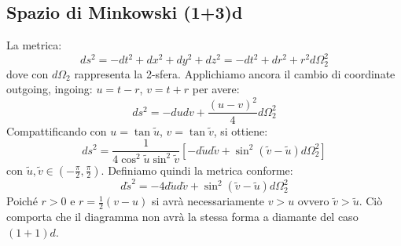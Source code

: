\subsection{Spazio di Minkowski (1+3)d}
La metrica:
\begin{equation*}
    ds^2= -dt^2 + dx^2 + dy^2 + dz^2 = -dt^2 + dr^2 + r^2d\Omega_2^2
\end{equation*}
dove con $d\Omega_2$ rappresenta la 2-sfera. Applichiamo ancora il cambio di coordinate outgoing, ingoing: $u = t - r$, $v = t+ r$ per avere:
\begin{equation*}
    ds^2 =-dudv + \frac{(u-v)^2}{4}d\Omega_2^2
\end{equation*}
Compattificando con $u = \tan\tilde{u}$, $v = \tan\tilde{v}$, si ottiene:
\begin{equation*}
    ds^2 = \frac{1}{4\cos^2\tilde{u}\sin^2\tilde{v}}\left[ - d\tilde{u}d\tilde{v} + \sin^2(\tilde{v}-\tilde{u})d\Omega_2^2\right]
\end{equation*}
con $\tilde{u}, \tilde{v} \in (-\frac{\pi}{2}, \frac{\pi}{2})$. Definiamo quindi la metrica conforme:
\begin{equation*}
    d\tilde{s}^2 = - 4 d\tilde{u}d\tilde{v} + \sin^2(\tilde{v}-\tilde{u})d\Omega_2^2
\end{equation*}
Poiché $r>0$ e $r = \frac{1}{2}(v-u)$ si avrà necessariamente $v > u$ ovvero $\tilde{v} > \tilde{u}$. Ciò comporta che il diagramma non avrà la stessa forma a diamante del caso $(1+1)d$.

